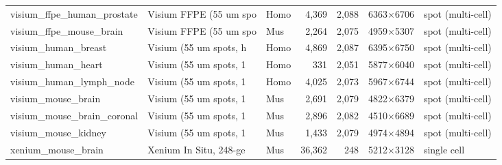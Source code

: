 \begin{table}[htbp]
\begin{tabular}{lllrrll}
visium\_ffpe\_human\_prostate & Visium FFPE (55 um spo & Homo & 4,369 & 2,088 & 6363$\times$6706 & spot (multi-cell) \\
visium\_ffpe\_mouse\_brain & Visium FFPE (55 um spo & Mus & 2,264 & 2,075 & 4959$\times$5307 & spot (multi-cell) \\
visium\_human\_breast & Visium (55 um spots, h & Homo & 4,869 & 2,087 & 6395$\times$6750 & spot (multi-cell) \\
visium\_human\_heart & Visium (55 um spots, 1 & Homo & 331 & 2,051 & 5877$\times$6040 & spot (multi-cell) \\
visium\_human\_lymph\_node & Visium (55 um spots, 1 & Homo & 4,025 & 2,073 & 5967$\times$6744 & spot (multi-cell) \\
visium\_mouse\_brain & Visium (55 um spots, 1 & Mus & 2,691 & 2,079 & 4822$\times$6379 & spot (multi-cell) \\
visium\_mouse\_brain\_coronal & Visium (55 um spots, 1 & Mus & 2,896 & 2,082 & 4510$\times$6689 & spot (multi-cell) \\
visium\_mouse\_kidney & Visium (55 um spots, 1 & Mus & 1,433 & 2,079 & 4974$\times$4894 & spot (multi-cell) \\
xenium\_mouse\_brain & Xenium In Situ, 248-ge & Mus & 36,362 & 248 & 5212$\times$3128 & single cell \\
\bottomrule
\end{tabular}
\end{table}

